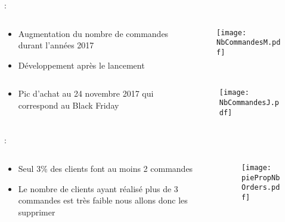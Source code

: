 \documentclass[8pt,aspectratio=169,hyperref={unicode=true}]{beamer}
\begin{document}
\begin{frame}{\insertsection: \insertsubsection}
    \begin{columns}
        \begin{column}{.5\textwidth}
            \begin{itemize}
                \item Augmentation du nombre de commandes durant l'années 2017
                \item Développement après le lancement
            \end{itemize}
        \end{column}
        \begin{column}{.5\textwidth}
            \begin{figure}
                \texttt{[image: NbCommandesM.pdf]}
            \end{figure}
        \end{column}
    \end{columns}
    \begin{columns}
        \begin{column}{.5\textwidth}
            \begin{itemize}
                \item Pic d'achat au 24 novembre 2017 qui correspond au Black Friday
            \end{itemize}
        \end{column}
        \begin{column}{.5\textwidth}
            \begin{figure}
                \texttt{[image: NbCommandesJ.pdf]}
            \end{figure}
        \end{column}
    \end{columns}
\end{frame}

\begin{frame}{\insertsection: \insertsubsection}
    \begin{columns}
        \begin{column}{.45\textwidth}
            \begin{itemize}
                \item Seul 3\% des clients font au moins 2 commandes
            \end{itemize}
            
            \begin{itemize}
                \item Le nombre de clients ayant réalisé plus de 3 commandes est très faible nous allons donc les supprimer
            \end{itemize}
        \end{column}
        \begin{column}{.55\textwidth}
            \begin{figure}
                \texttt{[image: piePropNbOrders.pdf]}
            \end{figure}
        \end{column}
    \end{columns}
\end{frame}
\end{document}
